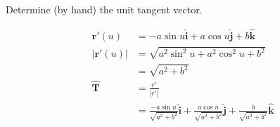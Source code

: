 Determine (by hand) the unit tangent vector.

\begin{solution}
\begin{align*}
    \boldsymbol{r'}(u) &= -a\sin u \hat{\boldsymbol{i}} + a\cos u \hat{\boldsymbol{j}} + b\hat{\boldsymbol{k}} \\
    |\boldsymbol{r'}(u)| &= \sqrt{a^2\sin^2u + a^2\cos^2u + b^2}\\ 
    &= \sqrt{a^2+b^2} \\
    \boldsymbol{\hat{T}} &= \frac{r'}{|r'|} \\
    &= \frac{-a\sin u}{\sqrt{a^2+b^2}} \hat{\boldsymbol{i}} + \frac{a\cos u}{\sqrt{a^2+b^2}} \hat{\boldsymbol{j}} + \frac{b}{\sqrt{a^2+b^2}} \hat{\boldsymbol{k}}
\end{align*}
\end{solution}